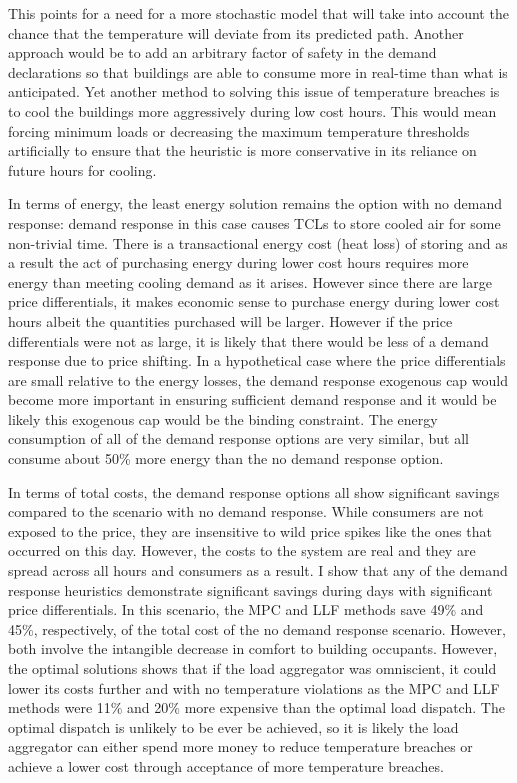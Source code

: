 \documentclass[journal]{IEEEtran}
\begin{document}
This points for a need for a more stochastic model that will take into account the chance that the temperature will deviate from its predicted path. Another approach would be to add an arbitrary factor of safety in the demand declarations so that buildings are able to consume more in real-time than what is anticipated. Yet another method to solving this issue of temperature breaches is to cool the buildings more aggressively during low cost hours. This would mean forcing minimum loads or decreasing the maximum temperature thresholds artificially to ensure that the heuristic is more conservative in its reliance on future hours for cooling.

In terms of energy, the least energy solution remains the option with no demand response: demand response in this case causes TCLs to store cooled air for some non-trivial time. There is a transactional energy cost (heat loss) of storing and as a result the act of purchasing energy during lower cost hours requires more energy than meeting cooling demand as it arises. However since there are large price differentials, it makes economic sense to purchase energy during lower cost hours albeit the quantities purchased will be larger. However if the price differentials were not as large, it is likely that there would be less of a demand response due to price shifting. In a hypothetical case where the price differentials are small relative to the energy losses, the demand response exogenous cap would become more important in ensuring sufficient demand response and it would be likely this exogenous cap would be the binding constraint. The energy consumption of all of the demand response options are very similar, but all consume about 50\% more energy than the no demand response option.

In terms of total costs, the demand response options all show significant savings compared to the scenario with no demand response. While consumers are not exposed to the price, they are insensitive to wild price spikes like the ones that occurred on this day. However, the costs to the system are real and they are spread across all hours and consumers as a result. I show that any of the demand response heuristics demonstrate significant savings during days with significant price differentials. In this scenario, the MPC and LLF methods save 49\% and 45\%, respectively, of the total cost of the no demand response scenario. However, both involve the intangible decrease in comfort to building occupants. However, the optimal solutions shows that if the load aggregator was omniscient, it could lower its costs further and with no temperature violations as the MPC and LLF methods were 11\% and 20\% more expensive than the optimal load dispatch. The optimal dispatch is unlikely to be ever be achieved, so it is likely the load aggregator can either spend more money to reduce temperature breaches or achieve a lower cost through acceptance of more temperature breaches.
\end{document}
